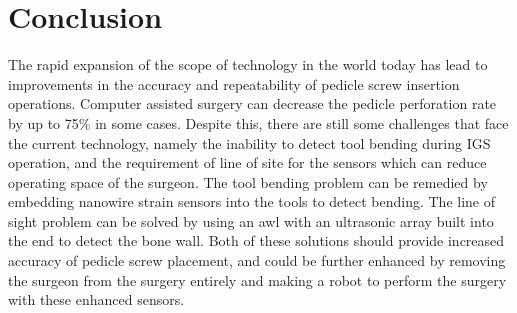 \documentclass[conference, a4paper]{IEEEtran}
\begin{document}
\section{Conclusion}
The rapid expansion of the scope of technology in the world today has
lead to improvements in the accuracy and repeatability of pedicle screw insertion
operations. Computer assisted surgery can decrease the pedicle perforation rate
by up to 75$\%$ in some cases\cite{Laine2000}. Despite this, there are still some
challenges that face the current technology, namely the inability to detect tool
bending during IGS operation, and the requirement of line of site for the sensors
which can reduce operating space of the surgeon. The tool bending problem can be
remedied by embedding nanowire strain sensors into the tools to detect bending.
The line of sight problem can be solved by using an awl with an ultrasonic
array built into the end to detect the bone wall. Both of these solutions 
should provide increased accuracy of pedicle screw placement, and could be
further enhanced by removing the surgeon from the surgery entirely and
making a robot to perform the surgery with these enhanced sensors.






%
%




\end{document}
